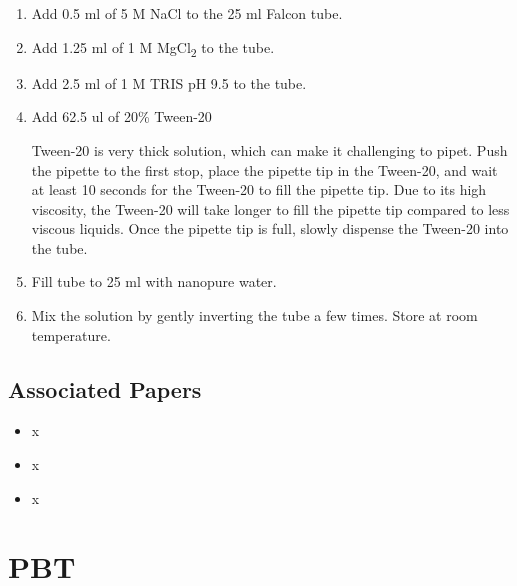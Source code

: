 \documentclass[
  letterpaper,
  DIV=11,
  numbers=noendperiod]{scrreprt}
\providecommand{\tightlist}{%
  \setlength{\itemsep}{0pt}\setlength{\parskip}{0pt}}\usepackage{longtable,booktabs,array}
\begin{document}
\begin{enumerate}
\def\labelenumi{\arabic{enumi}.}
\item
  Add 0.5 ml of 5 M NaCl to the 25 ml Falcon tube.
\item
  Add 1.25 ml of 1 M MgCl\textsubscript{2} to the tube.
\item
  Add 2.5 ml of 1 M TRIS pH 9.5 to the tube.
\item
  Add 62.5 ul of 20\% Tween-20

  \begin{tcolorbox}[enhanced jigsaw, rightrule=.15mm, title=\textcolor{quarto-callout-important-color}{\faExclamation}\hspace{0.5em}{NOTE}, titlerule=0mm, opacitybacktitle=0.6, toprule=.15mm, bottomrule=.15mm, opacityback=0, left=2mm, colframe=quarto-callout-important-color-frame, breakable, coltitle=black, colback=white, colbacktitle=quarto-callout-important-color!10!white, bottomtitle=1mm, leftrule=.75mm, toptitle=1mm, arc=.35mm]

  Tween-20 is very thick solution, which can make it challenging to
  pipet. Push the pipette to the first stop, place the pipette tip in
  the Tween-20, and wait at least 10 seconds for the Tween-20 to fill
  the pipette tip. Due to its high viscosity, the Tween-20 will take
  longer to fill the pipette tip compared to less viscous liquids. Once
  the pipette tip is full, slowly dispense the Tween-20 into the tube.

  \end{tcolorbox}
\item
  Fill tube to 25 ml with nanopure water.
\item
  Mix the solution by gently inverting the tube a few times. Store at
  room temperature.
\end{enumerate}

\hypertarget{associated-papers-70}{%
\section{Associated Papers}\label{associated-papers-70}}

\begin{itemize}
\tightlist
\item
  x
\item
  x
\item
  x
\end{itemize}

\hypertarget{sec-recipe-pbt}{%
\chapter{PBT}\label{sec-recipe-pbt}}
\end{document}

